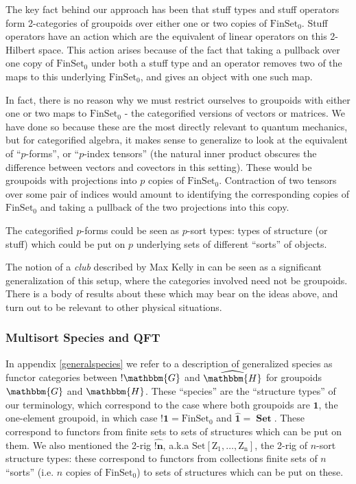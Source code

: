 \documentclass{amsart} \usepackage{amsmath,amssymb,bbm}
\newcommand{\opname}[1]{\operatorname{#1}}
\newcommand{\bldsym}[1]{\boldsymbol{#1}}
\newcommand{\catname}[1]{\boldsymbol{\opname{{#1}}}}
\newcommand{\FSN}{\catname{FinSet_0}}
\newcommand{\Set}{\catname{Set}}
\begin{document}
The key fact behind our approach has been that stuff types and stuff
operators form 2-categories of groupoids over either one or two copies
of $\FSN$.  Stuff operators have an action which are the equivalent of
linear operators on this 2-Hilbert space.  This action arises because
of the fact that taking a pullback over one copy of $\FSN$ under both
a stuff type and an operator removes two of the maps to this
underlying $\FSN$, and gives an object with one such map.

In fact, there is no reason why we must restrict ourselves to
groupoids with either one or two maps to $\FSN$ - the categorified
versions of vectors or matrices.  We have done so because these are
the most directly relevant to quantum mechanics, but for categorified
algebra, it makes sense to generalize to look at the equivalent of
``$p$-forms'', or ``$p$-index tensors'' (the natural inner product
obscures the difference between vectors and covectors in this
setting).  These would be groupoids with projections into $p$ copies
of $\FSN$.  Contraction of two tensors over some pair of indices would
amount to identifying the corresponding copies of $\FSN$ and taking a
pullback of the two projections into this copy.

The categorified $p$-forms could be seen as $p$-sort types: types of
structure (or stuff) which could be put on $p$ underlying sets of
different ``sorts'' of objects.

The notion of a \textit{club} described by Max Kelly in {\cite{kelly}}
can be seen as a significant generalization of this setup, where the
categories involved need not be groupoids.  There is a body of results
about these which may bear on the ideas above, and turn out to be
relevant to other physical situations.

\subsubsection{Multisort Species and QFT}

In appendix \ref{generalspecies} we refer to a description of
generalized species as functor categories between $! \mathbbm{G}$ and
$\widehat{\mathbbm{H}}$ for groupoids $\mathbbm{G}$ and $\mathbbm{H}$.
These ``species'' are the ``structure types'' of our terminology,
which correspond to the case where both groupoids are $\bldsym{1}$,
the one-element groupoid, in which case $!\bldsym{1}= \FSN$ and
$\hat{\bldsym{1}} = \Set$.  These correspond to functors from finite
sets to sets of structures which can be put on them.  We also
mentioned the 2-rig $\widehat{!\bldsym{n}}$, a.k.a $\catname{Set [
Z_1, \ldots, Z_n ]}$, the 2-rig of $n$-sort structure types: these
correspond to functors from collections finite sets of $n$ ``sorts''
(i.e. $n$ copies of $\FSN$) to sets of structures which can be put on
these.
\end{document}
